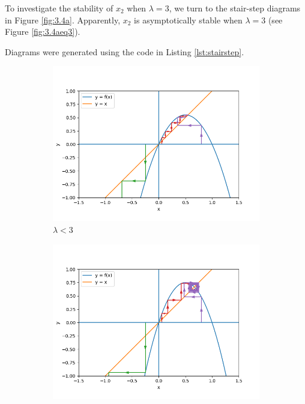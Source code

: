 \documentclass[nonumber]{homework}
\begin{document}
	To investigate the stability of $x_2$ when $\lambda = 3$, we turn to the stair-step diagrams in Figure \ref{fig:3.4a}. Apparently, $x_2$ is asymptotically stable when $\lambda = 3$ (see Figure \ref{fig:3.4aeq3}). 
	
	Diagrams were generated using the code in Listing \ref{lst:stairstep}.
	
	\begin{figure}[h]
		\begin{subfigure}{.33\textwidth}
			\centering
			\includegraphics[width=\linewidth]{3.4a lambda lt 3.png}
			\caption{$\lambda < 3$}
			\label{fig:3.4alt3}
		\end{subfigure}
		\begin{subfigure}{.33\textwidth}
			\centering
			\includegraphics[width=\linewidth]{3.4a lambda eq 3.png}

\end{subfigure}
\end{figure}
\end{document}
